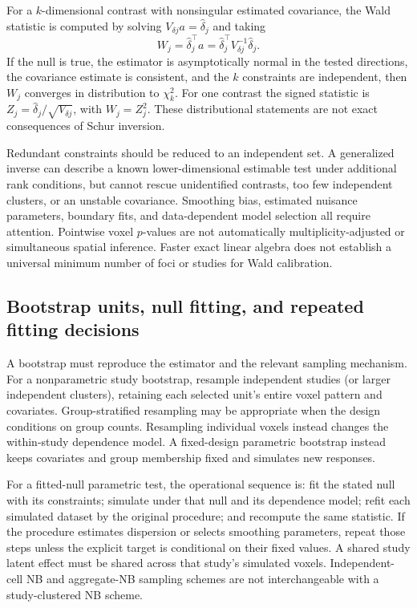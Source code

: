 For a $k$-dimensional contrast with nonsingular estimated covariance,
the Wald statistic is computed by solving $V_{\delta j}a=\widehat\delta_j$
and taking
\[
 W_j=\widehat\delta_j^\top a
     =\widehat\delta_j^\top V_{\delta j}^{-1}\widehat\delta_j .
\]
If the null is true, the estimator is asymptotically normal in the
tested directions, the covariance estimate is consistent, and the
$k$ constraints are independent, then $W_j$ converges in distribution
to $\chi_k^2$.  For one contrast the signed statistic is
$Z_j=\widehat\delta_j/\sqrt{V_{\delta j}}$, with $W_j=Z_j^2$.
These distributional statements are not exact consequences of Schur
inversion.

Redundant constraints should be reduced to an independent set.
A generalized inverse can describe a known lower-dimensional
estimable test under additional rank conditions, but cannot rescue
unidentified contrasts, too few independent clusters, or an unstable
covariance.  Smoothing bias, estimated nuisance parameters, boundary
fits, and data-dependent model selection all require attention.
Pointwise voxel $p$-values are not automatically multiplicity-adjusted
or simultaneous spatial inference.  Faster exact linear algebra does
not establish a universal minimum number of foci or studies for Wald
calibration.

\subsection{Bootstrap units, null fitting, and repeated fitting decisions}
\label{cov-bootstrap}

A bootstrap must reproduce the estimator and the relevant sampling
mechanism.  For a nonparametric study bootstrap, resample independent
studies (or larger independent clusters), retaining each selected
unit's entire voxel pattern and covariates.  Group-stratified resampling
may be appropriate when the design conditions on group counts.
Resampling individual voxels instead changes the within-study dependence
model.  A fixed-design parametric bootstrap instead keeps covariates
and group membership fixed and simulates new responses.

For a fitted-null parametric test, the operational sequence is:
fit the stated null with its constraints; simulate under that null
and its dependence model; refit each simulated dataset by the original
procedure; and recompute the same statistic.  If the procedure estimates
dispersion or selects smoothing parameters, repeat those steps unless
the explicit target is conditional on their fixed values.  A shared
study latent effect must be shared across that study's simulated voxels.
Independent-cell NB and aggregate-NB sampling schemes are not
interchangeable with a study-clustered NB scheme.

